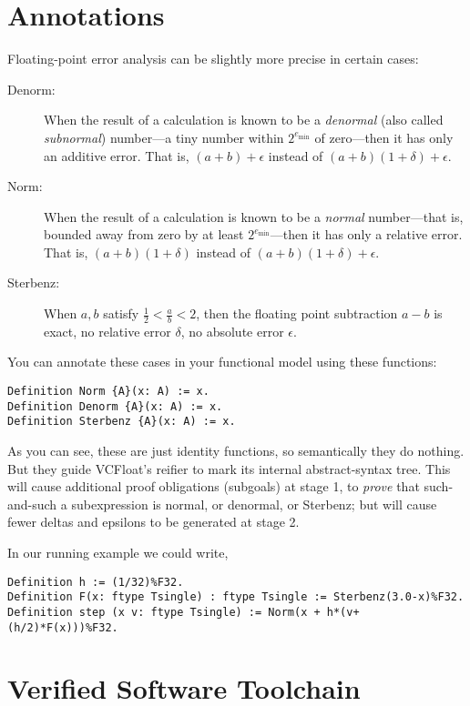 \documentclass[article]{memoir}
\begin{document}
\pagebreak 
\chapter{Annotations}

Floating-point error analysis can be slightly more precise
in certain cases:

\begin{description}
\item[Denorm:]  When the result of a calculation is known to be a
  \emph{denormal} (also called \emph{subnormal}) number---a tiny
  number within $2^{e_\mathrm{min}}$ of zero---then it has only
  an additive error.  That is, $(a+b)+\epsilon$ instead of
  $(a+b)(1+\delta)+\epsilon$.
\item[Norm:]
   When the result of a calculation is known to be a
   \emph{normal} number---that is, bounded away from zero by
   at least $2^{e_\mathrm{min}}$---then it has only
  a relative error.  That is, $(a+b)(1+\delta)$ instead of
  $(a+b)(1+\delta)+\epsilon$.
\item[Sterbenz:]  When $a,b$ satisfy $\frac{1}{2} < \frac{a}{b} < 2$,
  then the floating point subtraction $a-b$ is exact, no relative
  error $\delta$, no absolute error $\epsilon$.
\end{description}

You can annotate these cases in your functional model using these functions:

\begin{lstlisting}
Definition Norm {A}(x: A) := x.
Definition Denorm {A}(x: A) := x.
Definition Sterbenz {A}(x: A) := x.
\end{lstlisting}

As you can see, these are just identity functions, so semantically they
do nothing.  But they guide VCFloat's reifier to mark its internal
abstract-syntax tree.  This will cause additional proof obligations
(subgoals) at stage 1, to \emph{prove} that such-and-such a subexpression
is normal, or denormal, or Sterbenz; but will cause fewer
deltas and epsilons to be generated at stage 2.

In our running example we could write,
\begin{lstlisting}
Definition h := (1/32)%F32.
Definition F(x: ftype Tsingle) : ftype Tsingle := Sterbenz(3.0-x)%F32.  
Definition step (x v: ftype Tsingle) := Norm(x + h*(v+(h/2)*F(x)))%F32.
\end{lstlisting}

\chapter{Verified Software Toolchain}
\end{document}
